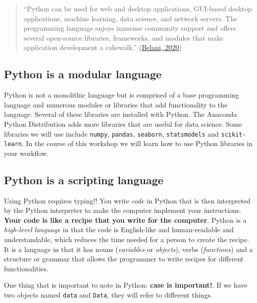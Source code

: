 \documentclass[
  letterpaper,
]{scrbook}
\begin{document}
\begin{quote}
``Python can be used for web and desktop applications, GUI-based desktop applications, machine learning, data science, and network servers. The programming language enjoys immense community support and offers several open-source libraries, frameworks, and modules that make application development a cakewalk.'' (\href{https://www.computer.org/publications/tech-news/trends/programming-languages-you-should-learn-in-2020}{Belani, 2020})
\end{quote}

\hypertarget{python-is-a-modular-language}{%
\subsection{Python is a modular language}\label{python-is-a-modular-language}}

Python is not a monolithic language but is comprised of a base programming language and numerous modules or libraries that add functionality to the language. Several of these libraries are installed with Python. The Anaconda Python Distribution adds more libraries that are useful for data science. Some libraries we will use include \texttt{numpy}, \texttt{pandas}, \texttt{seaborn}, \texttt{statsmodels} and \texttt{scikit-learn}. In the course of this workshop we will learn how to use Python libraries in your workflow.

\hypertarget{python-is-a-scripting-language}{%
\subsection{Python is a scripting language}\label{python-is-a-scripting-language}}

Using Python requires typing!! You write \emph{code} in Python that is then interpreted by the Python interpreter to make the computer implement your instructions. \textbf{Your code is like a recipe that you write for the computer}. Python is a \emph{high-level language} in that the code is English-like and human-readable and understandable, which reduces the time needed for a person to create the recipe. It is a language in that it has nouns (\emph{variables} or \emph{objects}), verbs (\emph{functions}) and a structure or grammar that allows the programmer to write recipes for different functionalities.

One thing that is important to note in Python: \textbf{case is important!}. If we have two objects named \texttt{data} and \texttt{Data}, they will refer to different things.
\end{document}
